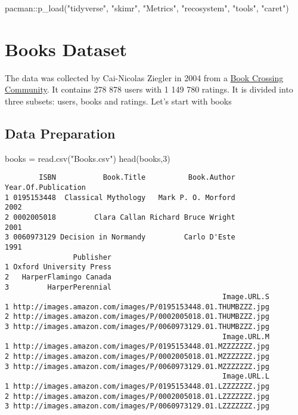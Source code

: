\documentclass[
]{report}
\newenvironment{Shaded}{\begin{snugshade}}{\end{snugshade}}
\newcommand{\DecValTok}[1]{\textcolor[rgb]{0.68,0.00,0.00}{#1}}
\newcommand{\FunctionTok}[1]{\textcolor[rgb]{0.28,0.35,0.67}{#1}}
\newcommand{\NormalTok}[1]{\textcolor[rgb]{0.00,0.23,0.31}{#1}}
\newcommand{\OtherTok}[1]{\textcolor[rgb]{0.00,0.23,0.31}{#1}}
\newcommand{\SpecialCharTok}[1]{\textcolor[rgb]{0.37,0.37,0.37}{#1}}
\newcommand{\StringTok}[1]{\textcolor[rgb]{0.13,0.47,0.30}{#1}}
\begin{document}
\begin{Shaded}
\begin{Highlighting}[]
\NormalTok{pacman}\SpecialCharTok{::}\FunctionTok{p\_load}\NormalTok{(}\StringTok{"tidyverse"}\NormalTok{, }\StringTok{"skimr"}\NormalTok{, }\StringTok{"Metrics"}\NormalTok{, }\StringTok{"recosystem"}\NormalTok{, }\StringTok{"tools"}\NormalTok{, }\StringTok{"caret"}\NormalTok{)}
\end{Highlighting}
\end{Shaded}

\section{Books Dataset}\label{books-dataset}

The data was collected by Cai-Nicolas Ziegler in 2004 from a
\href{https://www.bookcrossing.com/}{Book Crossing Community}. It
contains 278 878 users with 1 149 780 ratings. It is divided into three
subsets: users, books and ratings. Let's start with books

\subsection{Data Preparation}\label{data-preparation}

\begin{Shaded}
\begin{Highlighting}[]
\NormalTok{books   }\OtherTok{=} \FunctionTok{read.csv}\NormalTok{(}\StringTok{"Books.csv"}\NormalTok{)}
\FunctionTok{head}\NormalTok{(books,}\DecValTok{3}\NormalTok{)}
\end{Highlighting}
\end{Shaded}

\begin{verbatim}
        ISBN           Book.Title          Book.Author Year.Of.Publication
1 0195153448  Classical Mythology   Mark P. O. Morford                2002
2 0002005018         Clara Callan Richard Bruce Wright                2001
3 0060973129 Decision in Normandy         Carlo D'Este                1991
                Publisher
1 Oxford University Press
2   HarperFlamingo Canada
3         HarperPerennial
                                                   Image.URL.S
1 http://images.amazon.com/images/P/0195153448.01.THUMBZZZ.jpg
2 http://images.amazon.com/images/P/0002005018.01.THUMBZZZ.jpg
3 http://images.amazon.com/images/P/0060973129.01.THUMBZZZ.jpg
                                                   Image.URL.M
1 http://images.amazon.com/images/P/0195153448.01.MZZZZZZZ.jpg
2 http://images.amazon.com/images/P/0002005018.01.MZZZZZZZ.jpg
3 http://images.amazon.com/images/P/0060973129.01.MZZZZZZZ.jpg
                                                   Image.URL.L
1 http://images.amazon.com/images/P/0195153448.01.LZZZZZZZ.jpg
2 http://images.amazon.com/images/P/0002005018.01.LZZZZZZZ.jpg
3 http://images.amazon.com/images/P/0060973129.01.LZZZZZZZ.jpg
\end{verbatim}
\end{document}
